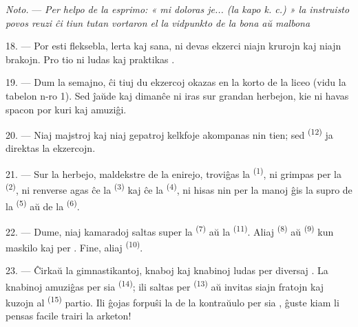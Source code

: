 \textit{Noto.} --- \textit{Per helpo de la esprimo: « mi doloras je... (la
kapo k. c.) » la instruisto povos reuzi ĉi tiun tutan vortaron el la
vidpunkto de la bona aŭ malbona} 

\VUsaut{5.0mm}
\VUsaut{2.4mm}
\VUsaut{3.0mm}

18. --- Por esti fleksebla, lerta kaj sana, ni devas ekzerci niajn krurojn kaj
niajn brakojn. Pro tio ni ludas kaj praktikas .

19. --- Dum la semajno, ĉi tiuj du ekzercoj okazas en la korto de la liceo
(vidu la tabelon n-ro 1). Sed ĵaŭde kaj dimanĉe ni iras sur grandan
herbejon, kie ni havas spacon por kuri kaj amuziĝi.

20. --- Niaj majstroj kaj niaj gepatroj kelkfoje akompanas nin tien; sed
 \textsuperscript{(12)} ja direktas la
ekzercojn.

21. --- Sur la herbejo, maldekstre de la enirejo, troviĝas la
 \textsuperscript{(1)}, ni grimpas per la
 \textsuperscript{(2)}, ni renverse agas ĉe la
 \textsuperscript{(3)} kaj ĉe la 
\textsuperscript{(4)}, ni hisas nin per la manoj ĝis la supro de la
 \textsuperscript{(5)} aŭ de la 
\textsuperscript{(6)}.

22. --- Dume, niaj kamaradoj saltas super la 
\textsuperscript{(7)} aŭ la  \textsuperscript{(11)}.
Aliaj  \textsuperscript{(8)} aŭ 
\textsuperscript{(9)} kun maskilo kaj per . Fine, aliaj
 \textsuperscript{(10)}.

\VUsaut{4.6mm}
\VUsaut{3.0mm}

23. --- Ĉirkaŭ la gimnastikantoj, knaboj kaj knabinoj ludas per diversaj
. La knabinoj amuziĝas per sia 
\textsuperscript{(14)}; ili saltas per  \textsuperscript{(13)}
aŭ invitas siajn fratojn kaj kuzojn al 
\textsuperscript{(15)} partio. Ili ĝojas forpuŝi la  de la
kontraŭulo per sia , ĝuste kiam li pensas facile
trairi la arketon!

